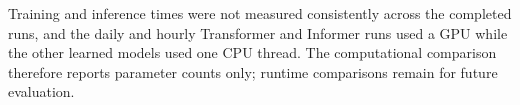 

Training and inference times were not measured consistently across the
completed runs, and the daily and hourly Transformer and Informer runs used
a GPU while the other learned models used one CPU thread. The computational
comparison therefore reports parameter counts only; runtime comparisons
remain for future evaluation.

